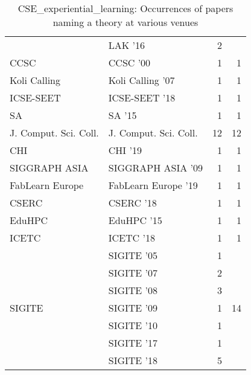 \begin{table*}[t]
\begin{tabular}{llrr}
& LAK '16 & 2 &\\
\multirow{1}{*}{CCSC } & CCSC '00 & 1 & \multirow{1}{*}{1}\\
\multirow{1}{*}{Koli Calling } & Koli Calling '07 & 1 & \multirow{1}{*}{1}\\
\multirow{1}{*}{ICSE-SEET } & ICSE-SEET '18 & 1 & \multirow{1}{*}{1}\\
\multirow{1}{*}{SA } & SA '15 & 1 & \multirow{1}{*}{1}\\
\multirow{1}{*}{J. Comput. Sci. Coll.} & J. Comput. Sci. Coll. & 12 & \multirow{1}{*}{12}\\
\multirow{1}{*}{CHI } & CHI '19 & 1 & \multirow{1}{*}{1}\\
\multirow{1}{*}{SIGGRAPH ASIA } & SIGGRAPH ASIA '09 & 1 & \multirow{1}{*}{1}\\
\multirow{1}{*}{FabLearn Europe } & FabLearn Europe '19 & 1 & \multirow{1}{*}{1}\\
\multirow{1}{*}{CSERC } & CSERC '18 & 1 & \multirow{1}{*}{1}\\
\multirow{1}{*}{EduHPC } & EduHPC '15 & 1 & \multirow{1}{*}{1}\\
\multirow{1}{*}{ICETC } & ICETC '18 & 1 & \multirow{1}{*}{1}\\
\multirow{7}{*}{SIGITE } & SIGITE '05 & 1 & \multirow{7}{*}{14}\\
& SIGITE '07 & 2 &\\
& SIGITE '08 & 3 &\\
& SIGITE '09 & 1 &\\
& SIGITE '10 & 1 &\\
& SIGITE '17 & 1 &\\
& SIGITE '18 & 5 &\\
\end{tabular}
\caption{CSE\_experiential\_learning: Occurrences of papers naming a theory at various venues}
\end{table*}